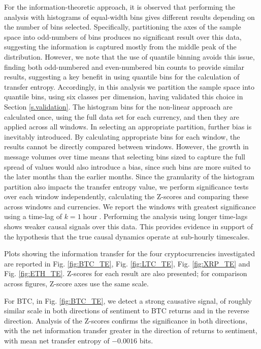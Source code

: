 \documentclass[]{rsos}%
\begin{document}
  For the information-theoretic approach, it is observed that performing the analysis with histograms of equal-width bins gives different results depending on the number of bins selected. Specifically, partitioning the axes of the sample space into odd-numbers of bins produces no significant result over this data, suggesting the information is captured mostly from the middle peak of the distribution. However, we note that the use of quantile binning avoids this issue, finding both odd-numbered and even-numbered bin counts to provide similar results, suggesting a key benefit in using quantile bins for the calculation of transfer entropy. Accordingly, in this analysis we partition the sample space into quantile bins, using six classes per dimension, having validated this choice in Section \ref{s.validation}. The histogram bins for the non-linear approach are calculated once, using the full data set for each currency, and then they are applied across all windows. In selecting an appropriate partition, further bias is inevitably introduced. By calculating appropriate bins for each window, the results cannot be directly compared between windows. However, the growth in message volumes over time means that selecting bins sized to capture the full spread of values would also introduce a bias, since such bins are more suited to the later months than the earlier months. Since the granularity of the histogram partition also impacts the transfer entropy value, we perform significance tests over each window independently, calculating the Z-scores and comparing these across windows and currencies.  We report the windows with greatest significance using a time-lag of $k=1\operatorname{hour}$. Performing the analysis using longer time-lags shows weaker causal signals over this data. This provides evidence in support of the hypothesis that the true causal dynamics operate at sub-hourly timescales.

  Plots showing the information transfer for the four cryptocurrencies investigated are reported in Fig. \ref{fig:BTC_TE}, Fig. \ref{fig:LTC_TE}, Fig. \ref{fig:XRP_TE} and Fig. \ref{fig:ETH_TE}. Z-scores for each result are also presented; for comparison across figures, Z-score axes  use the same scale.
  
  For BTC, in Fig. \ref{fig:BTC_TE}, we detect a strong causative signal, of roughly similar scale in both directions of sentiment to BTC returns and in the reverse direction. Analysis of the Z-scores confirms the significance in both directions, with the net information transfer greater in the direction of returns to sentiment, with mean net transfer entropy of $-0.0016$ bits.
  
\end{document}
